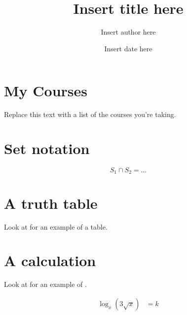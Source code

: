 \documentclass[12pt]{article}
\title{Insert title here}
\author{Insert author here}
\date{Insert date here}
\begin{document}
\maketitle

\section*{My Courses}
Replace this text with a list of the courses you're taking.


\section*{Set notation}


\[
    S_1 \cap S_2 = \dots
\]


\section*{A truth table}

Look at  for an example of a table.


\section*{A calculation}

Look at  for an example of .

\begin{align*}
    \log_x (3 \sqrt x) &= k \\
\end{align*}
\end{document}
